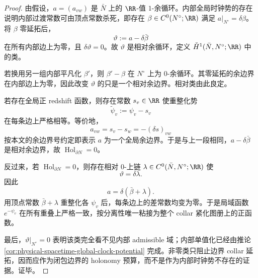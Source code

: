 \begin{proof}
由假设，\(a=(a_{vw})\) 是 \(\bar N\) 上的 \(\RR\)-值 \(1\)-余循环。内部全局时钟势的存在说明内部过渡常数可由顶点常数杀死，即存在 \(\beta\in C^0(N^\circ;\RR)\) 满足 \(a|_{N^\circ}=\delta\beta\)。将 \(\beta\) 零延拓后，
\[
\vartheta:=a-\delta\bar\beta
\]
在所有内部边上为零，且 \(\delta\vartheta=0\)。故 \(\vartheta\) 是相对余循环，定义 \(\check H^1(\bar N,N^\circ;\RR)\) 中的类。

若换用另一组内部平凡化 \(\beta'\)，则 \(\beta'-\beta\) 在 \(N^\circ\) 上为 \(0\)-余循环。其零延拓的余边界在内部边上为零，因此改变 \(\vartheta\) 的只是一个相对余边界。相对类由此良定。

若存在全局正 redshift 函数，则存在常数 \(s_v\in\RR\) 使重整化势
\[
\widetilde\psi_v:=\psi_v-s_v
\]
在每条边上严格相等。等价地，
\[
a_{vw}=s_v-s_w=-(\delta s)_{vw}
\]
按本文的余边界号约定即表示 \(a\) 为一个全局余边界。于是与上一段相同，\(a-\delta\bar\beta\) 是相对余边界，故 \(\operatorname{Hol}_{\partial N}=0\)。

反过来，若 \(\operatorname{Hol}_{\partial N}=0\)，则存在相对 \(0\)-上链 \(\lambda\in C^0(\bar N,N^\circ;\RR)\) 使
\[
\vartheta=\delta\lambda.
\]
因此
\[
a=\delta(\bar\beta+\lambda).
\]
用顶点常数 \(\bar\beta+\lambda\) 重整化各 \(\psi_v\) 后，每条边上的差常数均变为零。于是局域函数 \(e^{-\psi_v}\) 在所有重叠上严格一致，按分离性唯一粘接为整个 collar 紧化图册上的正函数。

最后，\(\vartheta|_{N^\circ}=0\) 表明该类完全看不见内部 admissible 域；内部单值化已经由推论 \ref{cor:physical-spacetime-global-clock-potential} 完成。非零类只阻止边界 collar 延拓，因而应作为闭包边界的 holonomy 预算，而不是作为内部时钟势不存在的证据。证毕。
\end{proof}



